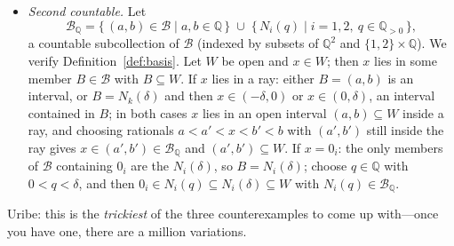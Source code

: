 \documentclass[11pt]{report}
\begin{document}
\begin{exbox}
\begin{itemize}
    \emph{$\varphi$ is open.} Since images commute with unions, it suffices that $\varphi(B)$ is open for $B \in \mathcal{B}_U$. For an interval $(a,b)$ in a ray, $\varphi((a,b)) = (a,b)$; $\varphi(N_i(\delta)) = (-\delta, 0) \cup \{0\} \cup (0, \delta) = (-\delta, \delta)$; $\varphi((-m,0) \cup (0,m)) = (-m,0) \cup (0,m)$. All are open in $(-\varepsilon, \varepsilon)$.

    \emph{$\varphi$ is continuous.} Since preimages commute with unions, it suffices that $\varphi^{-1}(J)$ is open for every open interval $J = (a,b)$ with $-\varepsilon \le a < b \le \varepsilon$, these forming a basis of $(-\varepsilon,\varepsilon)$. If $0 \notin J$, then $J$ lies in $(-\varepsilon,0)$ or $(0,\varepsilon)$ and $\varphi^{-1}(J) = J \in \mathcal{B}_U$. If $0 \in J$, i.e.\ $a < 0 < b$, then with $m = \min(-a, b)$,
    \[
    \varphi^{-1}(J) = (a, 0) \cup \{0_i\} \cup (0, b) = N_i(m) \cup (a, 0) \cup (0, b),
    \]
    a union of members of $\mathcal{B}_U$, hence open.

    Therefore $\varphi$ is a homeomorphism of the neighborhood $U$ of $0_i$ onto the open set $(-\varepsilon,\varepsilon) \subseteq \mathbb{R}$, and Proposition~\ref{prop:open-charts} shows $X$ is locally Euclidean of dimension $1$ at $0_i$.

    \item \textit{Second countable.} Let
    \[
    \mathcal{B}_{\mathbb{Q}} = \{\, (a,b) \in \mathcal{B} \mid a, b \in \mathbb{Q} \,\} \;\cup\; \{\, N_i(q) \mid i = 1, 2,\ q \in \mathbb{Q}_{>0} \,\},
    \]
    a countable subcollection of $\mathcal{B}$ (indexed by subsets of $\mathbb{Q}^2$ and $\{1,2\} \times \mathbb{Q}$). We verify Definition~\ref{def:basis}. Let $W$ be open and $x \in W$; then $x$ lies in some member $B \in \mathcal{B}$ with $B \subseteq W$.
    If $x$ lies in a ray: either $B = (a,b)$ is an interval, or $B = N_k(\delta)$ and then $x \in (-\delta, 0)$ or $x \in (0,\delta)$, an interval contained in $B$; in both cases $x$ lies in an open interval $(a,b) \subseteq W$ inside a ray, and choosing rationals $a < a' < x < b' < b$ with $(a',b')$ still inside the ray gives $x \in (a',b') \in \mathcal{B}_{\mathbb{Q}}$ and $(a',b') \subseteq W$.
    If $x = 0_i$: the only members of $\mathcal{B}$ containing $0_i$ are the $N_i(\delta)$, so $B = N_i(\delta)$; choose $q \in \mathbb{Q}$ with $0 < q < \delta$, and then $0_i \in N_i(q) \subseteq N_i(\delta) \subseteq W$ with $N_i(q) \in \mathcal{B}_{\mathbb{Q}}$.
\end{itemize}
Uribe: this is the \emph{trickiest} of the three counterexamples to come up with---once you have one, there are a million variations.
\end{exbox}
\end{document}
